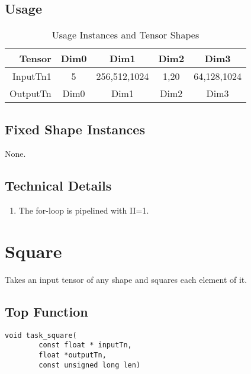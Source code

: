 \documentclass[•]{article}
\begin{document}
\subsection{Usage}
\begin{table}[htbp] %
\caption{Usage Instances and Tensor Shapes}
\label{tab:shapes_concat}
	\begin{center}
		\begin{tabular}{|r|c|c|c|c|} 
		\hline	
		Tensor & Dim0 & Dim1 & Dim2 & Dim3\\ 
		\hline	
		InputTn1 &
			5 &
			256,512,1024 &
			1,20 &
			64,128,1024 \\ 
		\hline
		OutputTn &
			Dim0 & 
			Dim1 & 
			Dim2 &
			Dim3	\\
		\hline
		\end{tabular}
	\end{center}
\end{table}

\subsection{Fixed Shape Instances}
None.

\subsection{Technical Details}
\begin{enumerate}
\item The for-loop is pipelined with II=1.
\end{enumerate}






\pagebreak





\section{Square}
Takes an input tensor of any shape and squares each element of it.

\subsection{Top Function}
\begin{lstlisting}
void task_square(
		const float * inputTn,
		float *outputTn,
		const unsigned long len)
\end{lstlisting}
\end{document}
